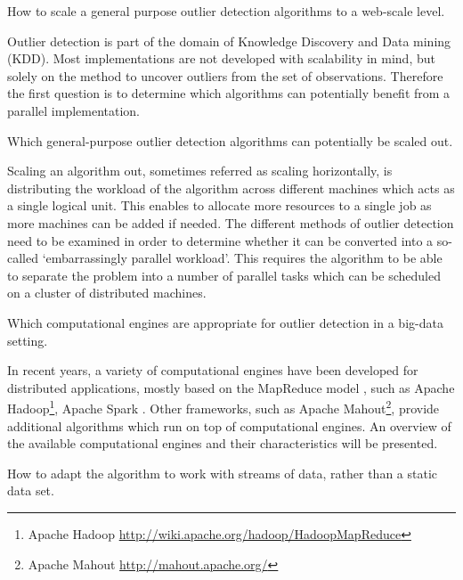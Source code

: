 \begin{research-question} 
How to scale a general purpose outlier detection algorithms to a web-scale level. \label{req1}
\end{research-question}   

Outlier detection is part of the domain of Knowledge Discovery and Data mining (KDD). Most implementations are not developed with scalability in mind, but solely on the method to uncover outliers from the set of observations. Therefore the first question is to determine which algorithms can potentially benefit from a parallel implementation.

\begin{research-sub-question} 
Which general-purpose outlier detection algorithms can potentially be scaled out. \label{sub-req1}
\end{research-sub-question}

Scaling an algorithm out, sometimes referred as scaling horizontally, is distributing the workload of the algorithm across different machines which acts as a single logical unit. This enables to allocate more resources to a single job as more machines can be added if needed. The different methods of outlier detection need to be examined in order to determine whether it can be converted into a so-called `embarrassingly parallel workload'. This requires the algorithm to be able to separate the problem into a number of parallel tasks which can be scheduled on a cluster of distributed machines.

\begin{research-sub-question} 
Which computational engines are appropriate for outlier detection in a big-data setting. \label{sub-req2}
\end{research-sub-question}

In recent years, a variety of computational engines have been developed for distributed applications, mostly based on the MapReduce model \cite{Dean:2008:MSD:1327452.1327492}, such as Apache Hadoop\footnote{Apache Hadoop \url{http://wiki.apache.org/hadoop/HadoopMapReduce}}, Apache Spark \cite{Zaharia:2010:SCC:1863103.1863113}. Other frameworks, such as Apache Mahout\footnote{Apache Mahout \url{http://mahout.apache.org/}}, provide additional algorithms which run on top of computational engines. An overview of the available computational engines and their characteristics will be presented.

\begin{research-sub-question} 
How to adapt the algorithm to work with streams of data, rather than a static data set. \label{sub-req3}
\end{research-sub-question}

